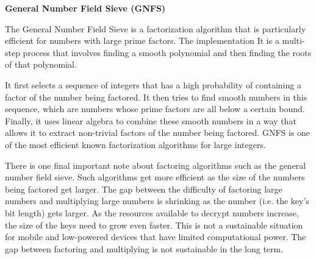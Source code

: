 \documentclass{article}
\begin{document}



\begin{center}
\textbf{General Number Field Sieve (GNFS)}
\end{center}

The General Number Field Sieve is a factorization algorithm that is particularly efficient for numbers with large prime factors. The implementation It is a multi-step process that involves finding a smooth polynomial and then finding the roots of that polynomial.

\vspace{2mm}
It first selects a sequence of integers that has a high probability of containing a factor of the number being factored. It then tries to find smooth numbers in this sequence, which are numbers whose prime factors are all below a certain bound. Finally, it uses linear algebra to combine these smooth numbers in a way that allows it to extract non-trivial factors of the number being factored. GNFS is one of the most efficient known factorization algorithms for large integers.

\vspace{2mm}
There is one final important note about factoring algorithms such as the general number field sieve. Such algorithms get more efficient as the size of the numbers being factored get larger. The gap between the difficulty of factoring large numbers and multiplying large numbers is shrinking as the number (i.e. the key's bit length) gets larger. As the resources available to decrypt numbers increase, the size of the keys need to grow even faster. This is not a sustainable situation for mobile and low-powered devices that have limited computational power. The gap between factoring and multiplying is not sustainable in the long term.
\end{document}
